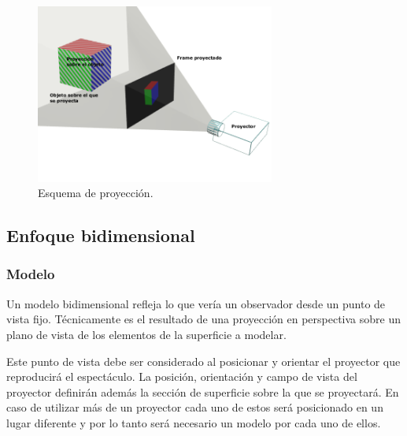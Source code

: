
\begin{figure}[H]
  \centering
    \includegraphics[width=0.7\textwidth]{./Cap2_videomapping/proy2dvs3d}
  \caption[Imagen propia]{Esquema de proyección.}
  \label{fig:proy2dvs3d}
\end{figure}

\subsection{Enfoque bidimensional}
\subsubsection{Modelo}
Un modelo bidimensional refleja lo que vería un observador desde un punto de vista fijo.
Técnicamente es el resultado de una proyección en perspectiva \cite{LibroCompGrafica} sobre un plano de vista de los elementos de la superficie a modelar.

Este punto de vista debe ser considerado al posicionar y orientar el proyector que reproducirá el espectáculo.
La posición, orientación y campo de vista del proyector definirán además la sección de superficie sobre la que se proyectará.
En caso de utilizar más de un proyector cada uno de estos será posicionado en un lugar diferente y por lo tanto será necesario un modelo por cada uno de ellos.

